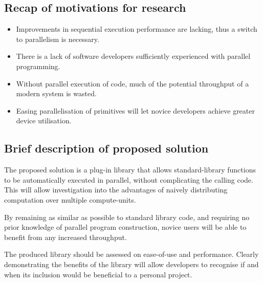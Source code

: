 \subsection{Recap of motivations for research}
\begin{itemize}
\item Improvements in sequential execution performance are lacking, thus a switch to parallelism is necessary.

\item There is a lack of software developers sufficiently experienced with parallel programming.

\item Without parallel execution of code, much of the potential throughput of a modern system is wasted.

\item Easing parallelisation of primitives will let novice developers achieve greater device utilisation.
\end{itemize}

\subsection{Brief description of proposed solution}
The proposed solution is a plug-in library that allows standard-library functions to be automatically executed in parallel, without complicating the calling code.
This will allow investigation into the advantages of naively distributing computation over multiple compute-units.

By remaining as similar as possible to standard library code, and requiring no prior knowledge of parallel program construction, novice users will be able to benefit from any increased throughput.

The produced library should be assessed on ease-of-use and performance. Clearly demonstrating the benefits of the library will allow developers to recognise if and when its inclusion would be beneficial to a personal project.
